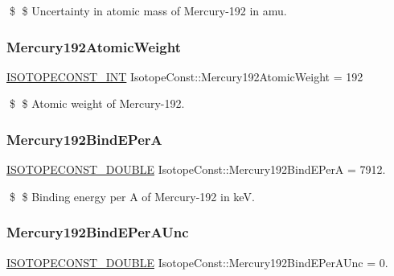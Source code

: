 \$ \$ Uncertainty in atomic mass of Mercury-\/192 in amu. \mbox{\label{group___isotope_const-_mercury-_hg192_ga1e1095f6eeb4a672b40164c44d0c28d6}} 
\subsubsection{\texorpdfstring{Mercury192\+Atomic\+Weight}{Mercury192AtomicWeight}}
{\footnotesize\ttfamily \mbox{\hyperlink{group___isotope_const-_macros_ga5f18360b3e99483a35c32d789e62621c}{I\+S\+O\+T\+O\+P\+E\+C\+O\+N\+S\+T\+\_\+\+I\+NT}} Isotope\+Const\+::\+Mercury192\+Atomic\+Weight = 192}

\$ \$ Atomic weight of Mercury-\/192. \mbox{\label{group___isotope_const-_mercury-_hg192_gae397ebc9f2945ccf48847bc24799cdf0}} 
\subsubsection{\texorpdfstring{Mercury192\+Bind\+E\+PerA}{Mercury192BindEPerA}}
{\footnotesize\ttfamily \mbox{\hyperlink{group___isotope_const-_macros_ga8f45a7272ce02c0b4c65c44636ed719a}{I\+S\+O\+T\+O\+P\+E\+C\+O\+N\+S\+T\+\_\+\+D\+O\+U\+B\+LE}} Isotope\+Const\+::\+Mercury192\+Bind\+E\+PerA = 7912.}

\$ \$ Binding energy per A of Mercury-\/192 in keV. \mbox{\label{group___isotope_const-_mercury-_hg192_ga86ca02db5e1b139acf8aebf36109e857}} 
\subsubsection{\texorpdfstring{Mercury192\+Bind\+E\+Per\+A\+Unc}{Mercury192BindEPerAUnc}}
{\footnotesize\ttfamily \mbox{\hyperlink{group___isotope_const-_macros_ga8f45a7272ce02c0b4c65c44636ed719a}{I\+S\+O\+T\+O\+P\+E\+C\+O\+N\+S\+T\+\_\+\+D\+O\+U\+B\+LE}} Isotope\+Const\+::\+Mercury192\+Bind\+E\+Per\+A\+Unc = 0.}

